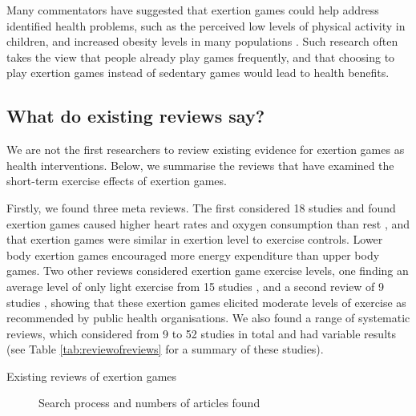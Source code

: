 Many commentators have suggested that exertion games could help address identified health problems, such as the perceived low levels of physical activity in children, and increased obesity levels in many populations \cite{marshall2017misrepresentation}. Such research often takes the view that people already play games frequently, and that choosing to play exertion games instead of sedentary games would lead to health benefits. 

\subsection{What do existing reviews say?}

We are not the first researchers to review existing evidence for exertion games as health interventions. Below, we summarise the reviews that have examined the short-term exercise effects of exertion games. 

Firstly, we found three meta reviews. The first considered 18 studies and found exertion games caused higher heart rates and oxygen consumption than rest \cite{Peng_2011}, and that exertion games were similar in exertion level to exercise controls. Lower body exertion games encouraged more energy expenditure than upper body games. Two other reviews considered exertion game exercise levels, one finding an average level of only light exercise from 15 studies \cite{Dutta2015EffectsReview}, and a second review of 9 studies \cite{barnett2011active}, showing that these exertion games elicited moderate levels of exercise as recommended by public health organisations. We also found a range of systematic reviews, which considered from 9 to 52 studies in total and had variable results (see  Table \ref{tab:reviewofreviews} for a summary of these studies).   

\begin{table}[]
    \caption{Existing reviews of exertion games}
    \label{tab:reviewofreviews}

\end{table}

\begin{figure}[]

\caption{Search process and numbers of articles found} \label{fig:flowchart}
\end{figure}





